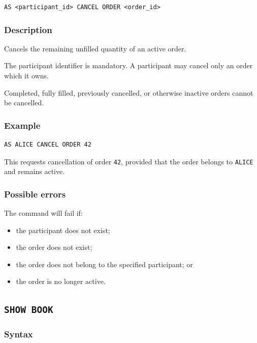 \documentclass{article}
\begin{document}
\begin{lstlisting}
AS <participant_id> CANCEL ORDER <order_id>
\end{lstlisting}

\subsubsection*{Description}

Cancels the remaining unfilled quantity of an active order.

The participant identifier is mandatory. A participant may cancel only
an order which it owns.

Completed, fully filled, previously cancelled, or otherwise inactive
orders cannot be cancelled.

\subsubsection*{Example}

\begin{lstlisting}
AS ALICE CANCEL ORDER 42
\end{lstlisting}

This requests cancellation of order \texttt{42}, provided that the order
belongs to \texttt{ALICE} and remains active.

\subsubsection*{Possible errors}

The command will fail if:

\begin{itemize}
    \item the participant does not exist;
    \item the order does not exist;
    \item the order does not belong to the specified participant; or
    \item the order is no longer active.
\end{itemize}

\subsection{\texttt{SHOW BOOK}}

\subsubsection*{Syntax}
\end{document}
